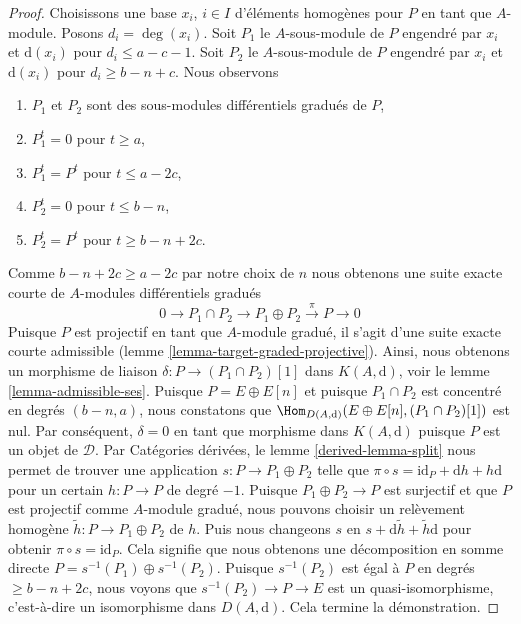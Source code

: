 \begin{proof}
\medskip\noindent
Choisissons une base $x_i$, $i \in I$ d'éléments homogènes pour $P$ en
tant que $A$-module. Posons $d_i =
\deg(x_i)$. Soit $P_1$ le $A$-sous-module de $P$ engendré par $x_i$
et $\text{d}(x_i)$ pour $d_i \leq a - c - 1$.
Soit $P_2$ le $A$-sous-module de $P$ engendré par $x_i$ et
$\text{d}(x_i)$ pour $d_i \geq b - n + c$. Nous
observons
\begin{enumerate}
\item $P_1$ et $P_2$ sont des sous-modules différentiels gradués de $P$,
\item $P_1^t = 0$ pour $t \geq a$,
\item $P_1^t = P^t$ pour $t \leq a - 2c$,
\item $P_2^t = 0$ pour $t \leq b - n$,
\item $P_2^t = P^t$ pour $t \geq b - n + 2c$.
\end{enumerate}
Comme $b - n + 2c \geq a - 2c$ par notre choix de $n$
nous obtenons une suite exacte courte de $A$-modules différentiels gradués
$$
0 \to P_1 \cap P_2 \to P_1 \oplus P_2 \xrightarrow{\pi} P \to 0
$$
Puisque $P$ est projectif en tant que $A$-module gradué, il s'agit d'une suite
exacte courte admissible (lemme \ref{lemma-target-graded-projective}).
Ainsi, nous obtenons un morphisme de
liaison $\delta : P \to (P_1 \cap P_2)[1]$ dans $K(A, \text{d})$, voir
le lemme \ref{lemma-admissible-ses}.
Puisque $P = E \oplus E[n]$ et puisque $P_1 \cap P_2$ est concentré en
degrés $(b - n, a)$, nous constatons que
$\Hom_{D(A, \text{d})}(E \oplus E[n], (P_1 \cap P_2)[1])$ est nul. Par
conséquent, $\delta = 0$ en tant que morphisme dans $K(A, \text{d})$
puisque $P$ est un objet de $\mathcal{D}$. Par
Catégories dérivées, le lemme \ref{derived-lemma-split} nous
permet de trouver une application $s : P \to P_1 \oplus P_2$
telle que $\pi \circ s = \text{id}_P + \text{d}h + h\text{d}$ pour un certain $h : P \to
P$ de degré $-1$. Puisque $P_1 \oplus P_2 \to P$ est surjectif et que $P$ est
projectif comme $A$-module gradué, nous pouvons choisir un relèvement homogène
$\tilde h : P \to P_1 \oplus P_2$ de $h$. Puis nous changeons $s$ en $s +
\text{d} \tilde h + \tilde h \text{d}$ pour obtenir $\pi \circ s =
\text{id}_P$. Cela signifie que nous obtenons une décomposition en
somme directe $P = s^{-1}(P_1) \oplus s^{-1}(P_2)$. Puisque
$s^{-1}(P_2)$ est égal à $P$ en degrés $\geq b - n + 2c$, nous voyons que
$s^{-1}(P_2) \to P \to E$ est un quasi-isomorphisme, c'est-à-dire un
isomorphisme dans $D(A, \text{d})$. Cela termine la démonstration.
\end{proof}








